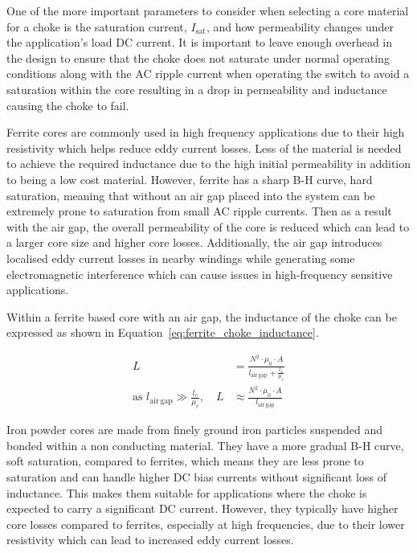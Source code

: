 \documentclass[a4paper, 12pt, titlepage]{report}
\begin{document}
One of the more important parameters to consider when selecting a core material for a choke is the saturation current, \(I_\mathrm{sat}\), and how permeability changes under the application's load DC current. It is important to leave enough overhead in the design to ensure that the choke does not saturate under normal operating conditions along with the AC ripple current when operating the switch to avoid a saturation within the core resulting in a drop in permeability and inductance causing the choke to fail.

Ferrite cores are commonly used in high frequency applications due to their high resistivity which helps reduce eddy current losses. Less of the material is needed to achieve the required inductance due to the high initial permeability in addition to being a low cost material. However, ferrite has a sharp B-H curve, hard saturation, meaning that without an air gap placed into the system can be extremely prone to saturation from small AC ripple currents. Then as a result with the air gap, the overall permeability of the core is reduced which can lead to a larger core size and higher core losses. Additionally, the air gap introduces localised eddy current losses in nearby windings while generating some electromagnetic interference which can cause issues in high-frequency sensitive applications.

Within a ferrite based core with an air gap, the inductance of the choke can be expressed as shown in Equation~\ref{eq:ferrite_choke_inductance}.

\begin{equation}
    \begin{split}
    L &= \frac{N^2 \cdot \mu_0 \cdot A}{l_{\mathrm{air\,gap}} + \frac{l_c}{\mu_r}}\\
    \text{as } l_{\mathrm{air\,gap}} \gg \tfrac{l_c}{\mu_r}, \quad L &\approx \frac{N^2 \cdot \mu_0 \cdot A}{l_{\mathrm{air\,gap}}}
    \end{split}
    \label{eq:ferrite_choke_inductance}
\end{equation}

Iron powder cores are made from finely ground iron particles suspended and bonded within a non conducting material. They have a more gradual B-H curve, soft saturation, compared to ferrites, which means they are less prone to saturation and can handle higher DC bias currents without significant loss of inductance. This makes them suitable for applications where the choke is expected to carry a significant DC current. However, they typically have higher core losses compared to ferrites, especially at high frequencies, due to their lower resistivity which can lead to increased eddy current losses.
\end{document}
